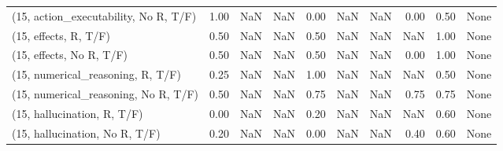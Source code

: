 \begin{table*}[h!]
\begin{adjustbox}{width=2\columnwidth,center}
\begin{tabular}{lrrr|rrr|rrr}
(15, action\_executability, No R, T/F) &                      1.00 &                   NaN &                       NaN &                          0.00 &                       NaN &                           NaN &                                   0.00 &                               0.50 &                                  None \\
(15, effects, R, T/F)                 &                      0.50 &                   NaN &                       NaN &                          0.50 &                       NaN &                           NaN &                                    NaN &                               1.00 &                                  None \\
(15, effects, No R, T/F)              &                      0.50 &                   NaN &                       NaN &                          0.50 &                       NaN &                           NaN &                                   0.00 &                               1.00 &                                  None \\
(15, numerical\_reasoning, R, T/F)     &                      0.25 &                   NaN &                       NaN &                          1.00 &                       NaN &                           NaN &                                    NaN &                               0.50 &                                  None \\
(15, numerical\_reasoning, No R, T/F)  &                      0.50 &                   NaN &                       NaN &                          0.75 &                       NaN &                           NaN &                                   0.75 &                               0.75 &                                  None \\
(15, hallucination, R, T/F)           &                      0.00 &                   NaN &                       NaN &                          0.20 &                       NaN &                           NaN &                                    NaN &                               0.60 &                                  None \\
(15, hallucination, No R, T/F)        &                      0.20 &                   NaN &                       NaN &                          0.00 &                       NaN &                           NaN &                                   0.40 &                               0.60 &                                  None \\

\end{tabular}
\end{adjustbox}
\end{table*}
